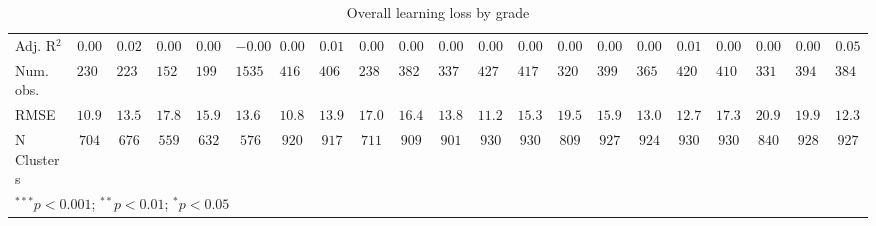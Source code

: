 \begin{table}
\begin{center}
\begin{tabular}{l c c c c c c c c c c c c c c c c c c c c}
Adj. R$^2$                & $0.00$        & $0.02$        & $0.00$   & $0.00$        & $-0.00$  & $0.00$        & $0.01$        & $0.00$   & $0.00$        & $0.00$       & $0.00$        & $0.00$        & $0.00$        & $0.00$      & $0.00$       & $0.01$        & $0.00$        & $0.00$   & $0.00$        & $0.05$        \\
Num. obs.                 & $23020$       & $22374$       & $15216$  & $19995$       & $15355$  & $41688$       & $40650$       & $23821$  & $38254$       & $33789$      & $42738$       & $41757$       & $32079$       & $39903$     & $36519$      & $42057$       & $41078$       & $33184$  & $39410$       & $38436$       \\
RMSE                      & $10.91$       & $13.55$       & $17.84$  & $15.92$       & $13.67$  & $10.86$       & $13.98$       & $17.07$  & $16.46$       & $13.80$      & $11.23$       & $15.35$       & $19.55$       & $15.95$     & $13.00$      & $12.77$       & $17.31$       & $20.93$  & $19.96$       & $12.39$       \\
N Clusters                & $704$         & $676$         & $559$    & $632$         & $576$    & $920$         & $917$         & $711$    & $909$         & $901$        & $930$         & $930$         & $809$         & $927$       & $924$        & $930$         & $930$         & $840$    & $928$         & $927$         \\
\hline
\multicolumn{21}{l}{\scriptsize{$^{***}p<0.001$; $^{**}p<0.01$; $^{*}p<0.05$}}
\end{tabular}
\caption{Overall learning loss by grade}
\label{table:grade}
\end{center}
\end{table}

